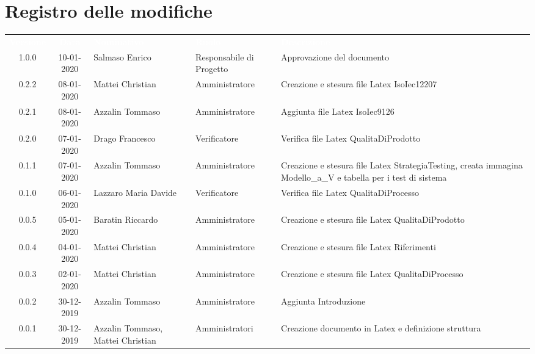 \section*{Registro delle modifiche}
{
\renewcommand{\arraystretch}{1.5}
\centering
\begin{longtable}{ c c  C{4cm}  C{3cm} C{4cm}}
\textcolor{white}{\textbf{Versione}} & \textcolor{white}{\textbf{Data}} & \textcolor{white}{\textbf{Nominativo}} & \textcolor{white}{\textbf{Ruolo}} & \textcolor{white}{\textbf{Descrizione}}\\	

1.0.0 & 10-01-2020 & Salmaso Enrico & Responsabile di Progetto & Approvazione del documento \\	

0.2.2 & 08-01-2020 & Mattei Christian & Amministratore & Creazione e stesura file Latex IsoIec12207 \\
0.2.1 & 08-01-2020 & Azzalin Tommaso & Amministratore & Aggiunta file Latex IsoIec9126 \\
0.2.0 & 07-01-2020 & Drago Francesco & Verificatore & Verifica file Latex QualitaDiProdotto \\
0.1.1 & 07-01-2020 & Azzalin Tommaso & Amministratore & Creazione e stesura file Latex StrategiaTesting, creata immagina Modello\_a\_V e tabella per i test di sistema \\
0.1.0 & 06-01-2020 & Lazzaro Maria Davide & Verificatore & Verifica file Latex QualitaDiProcesso \\
0.0.5 & 05-01-2020 & Baratin Riccardo & Amministratore & Creazione e stesura file Latex QualitaDiProdotto \\
0.0.4 & 04-01-2020 & Mattei Christian & Amministratore & Creazione e stesura file Latex Riferimenti \\
0.0.3 & 02-01-2020 & Mattei Christian & Amministratore & Creazione e stesura file Latex QualitaDiProcesso \\
0.0.2 & 30-12-2019 & Azzalin Tommaso & Amministratore & Aggiunta Introduzione \\
0.0.1 & 30-12-2019 & Azzalin Tommaso, Mattei Christian & Amministratori & Creazione documento in Latex e definizione struttura \\	
		
\end{longtable}
}

